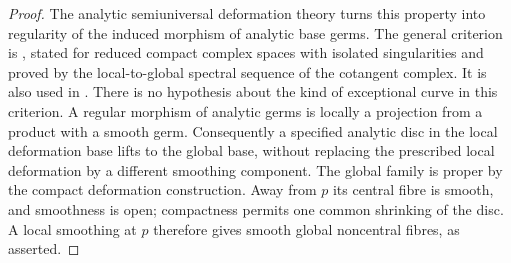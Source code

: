 \begin{proof}
The analytic semiuniversal deformation theory turns this
property into regularity of the induced morphism of analytic
base germs.  The general criterion is
\citet[Lemma~1, p.~93]{Manetti1991D}, stated for reduced compact
complex spaces with isolated singularities and proved by the
local-to-global spectral sequence of the cotangent complex.
It is also used in
\citet[Section~3.2, Proposition~3.3 and the discussion preceding
Proposition~3.4]{DlousskyTeleman2020D}.
There is no hypothesis about the kind of exceptional curve
in this criterion.  A regular morphism of analytic
germs is locally a projection from a product with a smooth
germ.  Consequently a specified analytic disc in the local
deformation base lifts to the global base, without replacing
the prescribed local deformation by a different smoothing
component.
The global family is proper by the compact deformation
construction.  Away from $p$ its central fibre is smooth,
and smoothness is open; compactness permits one common
shrinking of the disc.  A local smoothing at $p$ therefore
gives smooth global noncentral fibres, as asserted.
\end{proof}
